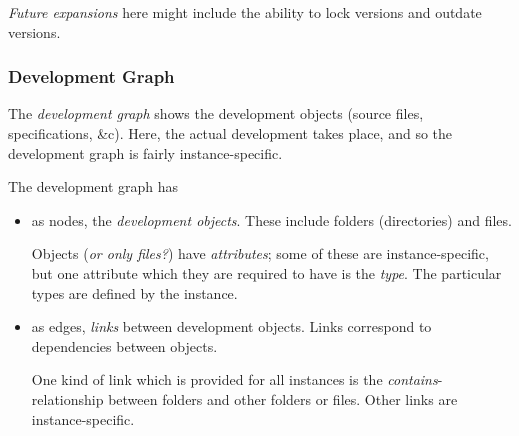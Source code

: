 \documentclass[a4paper]{article}
\begin{document}
\emph{Future expansions} here might include the ability to lock
versions and outdate versions.

\subsubsection{Development Graph}
\label{sec:development-graph}

The \emph{development graph} shows the development objects (source
files, specifications, \&c). Here, the actual development takes
place, and so the development graph is fairly instance-specific. 

The development graph has 
\begin{itemize}
\item as nodes, the \emph{development objects}. These include folders
  (directories) and files. 

  Objects (\emph{or only files?}) have \emph{attributes}; some of
  these are instance-specific, but one attribute which they are
  required to have is the \emph{type}. The particular types are
  defined by the instance.

\item as edges, \emph{links} between development objects. Links
  correspond to dependencies between objects.
  
  One kind of link which is provided for all instances is the
  \emph{contains}-relationship between folders and other folders or
  files. Other links are instance-specific.
\end{itemize}
\end{document}
